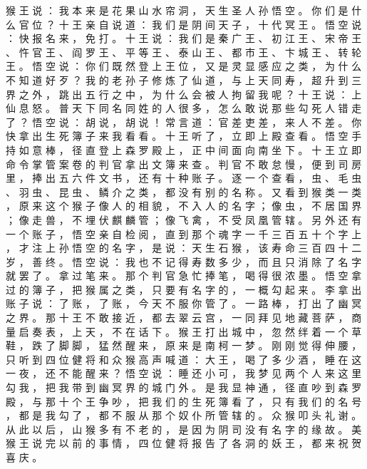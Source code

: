 {猴 王 说 ： 我 本 来 是 花 果 山 水 帘 洞 ， 天 生 圣 人 孙 悟 空 。
你 们 是 什 么 官 位 ？ 十 王 亲 自 说 道 ： 我 们 是 阴 间 天 子 ， 十 代 冥 王 。
悟 空 说 ： 快 报 名 来 ， 免 打 。
十 王 说 ： 我 们 是 秦 广 王 、 初 江 王 、 宋 帝 王 、 忤 官 王 、 阎 罗 王 、 平 等 王 、 泰 山 王 、 都 市 王 、 卞 城 王 、 转 轮 王 。
悟 空 说 ： 你 们 既 然 登 上 王 位 ， 又 是 灵 显 感 应 之 类 ， 为 什 么 不 知 道 好 歹 ？ 我 的 老 孙 子 修 炼 了 仙 道 ， 与 上 天 同 寿 ， 超 升 到 三 界 之 外 ， 跳 出 五 行 之 中 ， 为 什 么 会 被 人 拘 留 我 呢 ？ 十 王 说 ： 上 仙 息 怒 。
普 天 下 同 名 同 姓 的 人 很 多 ， 怎 么 敢 说 那 些 勾 死 人 错 走 了 ？ 悟 空 说 ： 胡 说 ， 胡 说 ！ 常 言 道 ： 官 差 吏 差 ， 来 人 不 差 。
你 快 拿 出 生 死 簿 子 来 我 看 看 。 十 王 听 了 ， 立 即 上 殿 查 看 。
悟 空 手 持 如 意 棒 ， 径 直 登 上 森 罗 殿 上 ， 正 中 间 面 向 南 坐 下 。
十 王 立 即 命 令 掌 管 案 卷 的 判 官 拿 出 文 簿 来 查 。
判 官 不 敢 怠 慢 ， 便 到 司 房 里 ， 捧 出 五 六 件 文 书 ， 还 有 十 种 账 子 。
逐 一 个 查 看 ， 虫 、 毛 虫 、 羽 虫 、 昆 虫 、 鳞 介 之 类 ， 都 没 有 别 的 名 称 。
又 看 到 猴 类 一 类 ， 原 来 这 个 猴 子 像 人 的 相 貌 ， 不 入 人 的 名 字 ； 像 虫 ， 不 居 国 界 ； 像 走 兽 ， 不 埋 伏 麒 麟 管 ； 像 飞 禽 ， 不 受 凤 凰 管 辖 。
另 外 还 有 一 个 账 子 ， 悟 空 亲 自 检 阅 ， 直 到 那 个 魂 字 一 千 三 百 五 十 个 字 上 ， 才 注 上 孙 悟 空 的 名 字 ， 是 说 ： 天 生 石 猴 ， 该 寿 命 三 百 四 十 二 岁 ， 善 终 。
悟 空 说 ： 我 也 不 记 得 寿 数 多 少 ， 而 且 只 消 除 了 名 字 就 罢 了 。
拿 过 笔 来 。
那 个 判 官 急 忙 捧 笔 ， 喝 得 很 浓 墨 。
悟 空 拿 过 的 簿 子 ， 把 猴 属 之 类 ， 只 要 有 名 字 的 ， 一 概 勾 起 来 。
李 拿 出 账 子 说 ： 了 账 ， 了 账 ， 今 天 不 服 你 管 了 。
一 路 棒 ， 打 出 了 幽 冥 之 界 。
那 十 王 不 敢 接 近 ， 都 去 翠 云 宫 ， 一 同 拜 见 地 藏 菩 萨 ， 商 量 启 奏 表 ， 上 天 ， 不 在 话 下 。
猴 王 打 出 城 中 ， 忽 然 绊 着 一 个 草 鞋 ， 跌 了 脚 脚 ， 猛 然 醒 来 ， 原 来 是 南 柯 一 梦 。
刚 刚 觉 得 伸 腰 ， 只 听 到 四 位 健 将 和 众 猴 高 声 喊 道 ： 大 王 ， 喝 了 多 少 酒 ， 睡 在 这 一 夜 ， 还 不 能 醒 来 ？ 悟 空 说 ： 睡 还 小 可 ， 我 梦 见 两 个 人 来 这 里 勾 我 ， 把 我 带 到 幽 冥 界 的 城 门 外 。
是 我 显 神 通 ， 径 直 吵 到 森 罗 殿 ， 与 那 十 个 王 争 吵 ， 把 我 们 的 生 死 簿 看 了 ， 只 有 我 们 的 名 号 ， 都 是 我 勾 了 ， 都 不 服 从 那 个 奴 仆 所 管 辖 的 。
众 猴 叩 头 礼 谢 。
从 此 以 后 ， 山 猴 多 有 不 老 的 ， 是 因 为 阴 司 没 有 名 字 的 缘 故 。
美 猴 王 说 完 以 前 的 事 情 ， 四 位 健 将 报 告 了 各 洞 的 妖 王 ， 都 来 祝 贺 喜 庆 。
}
